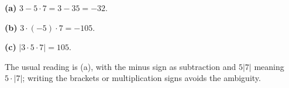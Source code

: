 \textbf{(a)} $3-5\cdot7=3-35=\boxed{-32}$.

\textbf{(b)} $3\cdot(-5)\cdot7=\boxed{-105}$.

\textbf{(c)} $|3\cdot5\cdot7|=\boxed{105}$.

The usual reading is (a), with the minus sign as subtraction and $5|7|$ meaning $5\cdot|7|$; writing the brackets or multiplication signs avoids the ambiguity.

